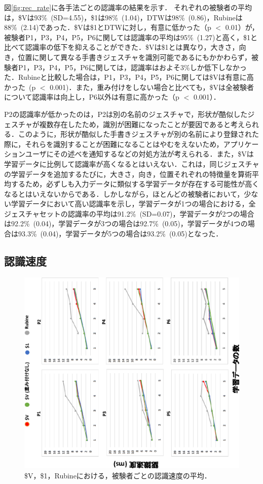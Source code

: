 図\ref{fig:rec_rate}に各手法ごとの認識率の結果を示す．
それぞれの被験者の平均は，\$Vは93\%~(SD=4.55)，\$1は98\%~(1.04)，DTWは98\%~(0.86)，Rubineは88\%~(2.14)であった．\$Vは\$1とDTWに対し，有意に低かった（p $<$ 0.01）が，被験者P1，P3，P4，P5，P6に関しては認識率の平均は95\%~(1.27)と高く，\$1と比べて認識率の低下を抑えることができた．\$Vは\$1とは異なり，大きさ，向き，位置に関して異なる手書きジェスチャを識別可能であるにもかかわらず，被験者P1，P3，P4，P5，P6に関しては，認識率はおよそ3\%しか低下しなかった．Rubineと比較した場合は，P1，P3，P4，P5，P6に関しては\$Vは有意に高かった~(p $<$ 0.001)．また，重み付けをしない場合と比べても，\$Vは全被験者について認識率は向上し，P6以外は有意に高かった（p $<$ 0.001）．

P2の認識率が低かったのは，P2は別の名前のジェスチャで，形状が酷似したジェスチャが複数存在したため，識別が困難になったことが要因であると考えられる．このように，形状が酷似した手書きジェスチャが別の名前により登録された際に，それらを識別することが困難になることはやむをえないため，アプリケーションユーザにその述べを通知するなどの対処方法が考えられる．また，\$Vは学習データに比例して認識率が高くなるとはいえない．これは，同じジェスチャの学習データを追加するたびに，大きさ，向き，位置それぞれの特徴量を算術平均するため，必ずしも入力データに類似する学習データが存在する可能性が高くなるとはいえないからである．しかしながら，ほとんどの被験者において，少ない学習データにおいて高い認識率を示し，学習データが1つの場合における，全ジェスチャセットの認識率の平均は91.2\%~(SD=0.07)，学習データが2つの場合は92.2\%~(0.04)，学習データが3つの場合は92.7\%~(0.05)，学習データが4つの場合は93.3\%~(0.04)，学習データが5つの場合は93.2\%~(0.05)となった．

\newpage
\subsection{認識速度}
\begin{figure}[!h]
\centering
\includegraphics[width=1.0\columnwidth,angle=-90]{img/rec_speed.eps}
\caption{\$V，\$1，Rubineにおける，被験者ごとの認識速度の平均．}
\label{fig:rec_speed}
\end{figure}

